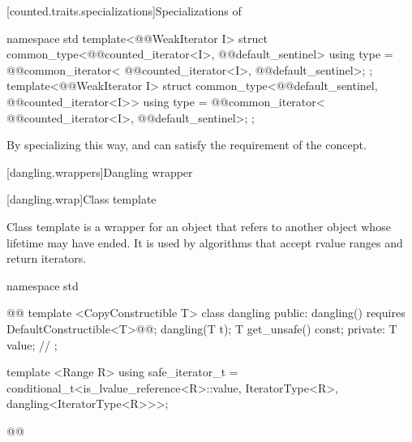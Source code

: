 \begin{addedblock}
[counted.traits.specializations]{Specializations of }

%
\begin{itemdecl}
namespace std {
  template<@@WeakIterator I>
  struct common_type<@@counted_iterator<I>,
                     @@default_sentinel> {
    using type = @@common_iterator<
      @@counted_iterator<I>,
      @@default_sentinel>;
  };
  template<@@WeakIterator I>
  struct common_type<@@default_sentinel,
                     @@counted_iterator<I>> {
    using type = @@common_iterator<
      @@counted_iterator<I>,
      @@default_sentinel>;
  };
}
\end{itemdecl}

\begin{itemdescr}
\pnum
\enternote By specializing  this way, 
and  can satisfy the  requirement of the
 concept.\exitnote
\end{itemdescr}

{\color{newclr}
[dangling.wrappers]{Dangling wrapper}

[dangling.wrap]{Class template }

\pnum
{}%
Class template  is a wrapper for an object that refers to another object whose
lifetime may have ended. It is used by algorithms that accept rvalue ranges and return iterators.

\begin{codeblock}
namespace std { @@
  template <CopyConstructible T>
  class dangling {
  public:
    dangling() requires DefaultConstructible<T>@\newtxt{()}@;
    dangling(T t);
    T get_unsafe() const;
  private:
    T value; // \expos
  };

  template <Range R>
  using safe_iterator_t =
    conditional_t<is_lvalue_reference<R>::value, IteratorType<R>, dangling<IteratorType<R>>>;
}@\newtxt{\}\}}@
\end{codeblock}

}
\end{addedblock}
